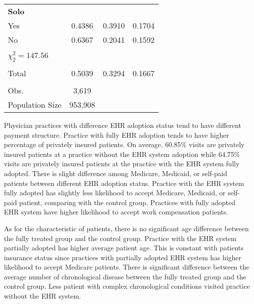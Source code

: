 \documentclass[12pt]{report}
\begin{document}
{\begin{center}
\begin{longtable}{lccc}
\textbf{Solo}                          &          &            &            \\
Yes                                    & 0.4386   & 0.3910     & 0.1704     \\
No                                     & 0.6367   & 0.2041     & 0.1592     \\
                                       &          &            &            \\
$\chi^2_2 = 147.56$                    &          &            &            \\
                                       &          &            &            \\
Total                                  & 0.5039   & 0.3294     & 0.1667     \\
                                       &          &            &            \\
Obs.                                   & 3,619    &            &            \\
Population Size                        & 953,908  &            &            \\ 
\end{longtable}
\end{center}}

Physician practices with difference EHR adoption status tend to have different payment structure. Practice with fully EHR adoption tends to have higher percentage of privately insured patients. On average, 60.85\% visits are privately insured patients at a practice without the EHR system adoption while 64.75\% visits are privately insured patients at the practice with the EHR system fully adopted. There is slight difference among Medicare, Medicaid, or self-paid patients between different EHR adoption status. Practice with the EHR system fully adopted has slightly less likelihood to accept Medicare, Medicaid, or self-paid patient, comparing with the control group. Practices with fully adopted EHR system have higher likelihood to accept work compensation patients.

As for the characteristic of patients, there is no significant age difference between the fully treated group and the control group. Practice with the EHR system partially adopted has higher average patient age. This is constant with patients insurance status since practices with partially adopted EHR system has higher likelihood to accept Medicare patients.  There is significant difference between the average number of chronological disease between the fully treated group and the control group. Less patient with complex chronological conditions visited practice without the EHR system. 
\end{document}
